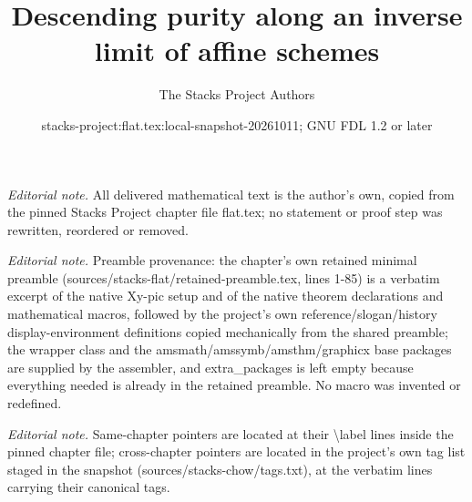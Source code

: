 \documentclass[10pt,a4paper]{amsart}
\title{Descending purity along an inverse limit of affine schemes}
\author{The Stacks Project Authors}
\date{stacks-project:flat.tex:local-snapshot-20261011; GNU FDL 1.2 or later}
\theoremstyle{plain}
\theoremstyle{definition}
\theoremstyle{remark}
\numberwithin{equation}{subsection}
\begin{document}
\maketitle
\noindent\textit{Editorial note.} All delivered mathematical text is the author's own, copied from the pinned Stacks Project chapter file flat.tex; no statement or proof step was rewritten, reordered or removed.\par\medskip
\noindent\textit{Editorial note.} Preamble provenance: the chapter's own retained minimal preamble (sources/stacks-flat/retained-preamble.tex, lines 1-85) is a verbatim excerpt of the native Xy-pic setup and of the native theorem declarations and mathematical macros, followed by the project's own reference/slogan/history display-environment definitions copied mechanically from the shared preamble; the wrapper class and the amsmath/amssymb/amsthm/graphicx base packages are supplied by the assembler, and extra\_packages is left empty because everything needed is already in the retained preamble. No macro was invented or redefined.\par\medskip
\noindent\textit{Editorial note.} Same-chapter pointers are located at their \textbackslash{}label lines inside the pinned chapter file; cross-chapter pointers are located in the project's own tag list staged in the snapshot (sources/stacks-chow/tags.txt), at the verbatim lines carrying their canonical tags.\par\medskip
\end{document}
